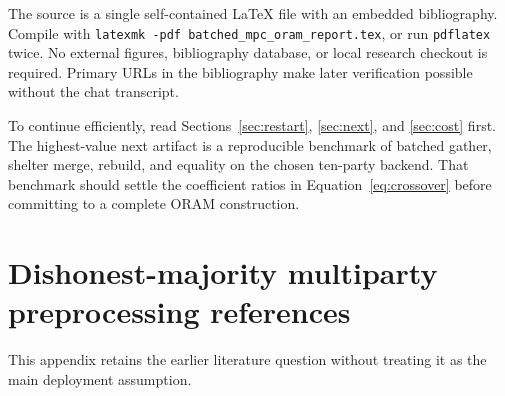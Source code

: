 \documentclass[11pt]{article}
\begin{document}
The source is a single self-contained LaTeX file with an embedded bibliography.
Compile with \texttt{latexmk -pdf batched\_mpc\_oram\_report.tex}, or run
\texttt{pdflatex} twice. No external figures, bibliography database, or local
research checkout is required. Primary URLs in the bibliography make later
verification possible without the chat transcript.

To continue efficiently, read Sections~\ref{sec:restart}, \ref{sec:next}, and
\ref{sec:cost} first. The highest-value next artifact is a reproducible benchmark
of batched gather, shelter merge, rebuild, and equality on the chosen ten-party
backend. That benchmark should settle the coefficient ratios in
Equation~\eqref{eq:crossover} before committing to a complete ORAM construction.

\appendix
\section{Dishonest-majority multiparty preprocessing references}\label{app:dm}

This appendix retains the earlier literature question without treating it as
the main deployment assumption.
\end{document}
